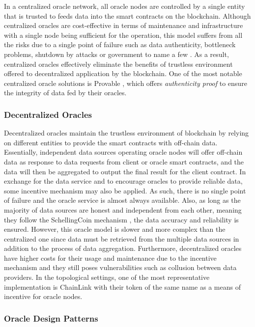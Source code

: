 In a centralized oracle network, all oracle nodes are controlled by a single entity that is trusted to feeds data into the smart contracts on the blockchain. Although centralized oracles are cost-effective in terms of maintenance and infrastructure with a single node being sufficient for the operation, this model suffers from all the risks due to a single point of failure such as data authenticity, bottleneck problems, shutdown by attacks or government to name a few \cite{caldarelli2020understanding}. As a result, centralized oracles effectively eliminate the benefits of trustless environment offered to decentralized application by the blockchain. One of the most notable centralized oracle solutions is Provable \cite{team2019scalable}, which offers \textit{authenticity proof} to ensure the integrity of data fed by their oracles.
  
\subsubsection{Decentralized Oracles}

Decentralized oracles maintain the trustless environment of blockchain by relying on different entities to provide the smart contracts with off-chain data. Essentially, independent data sources operating oracle nodes will offer off-chain data as response to data requests from client or oracle smart contracts, and the data will then be aggregated to output the final result for the client contract. In exchange for the data service and to encourage oracles to provide reliable data, some incentive mechanism may also be applied. As such, there is no single point of failure and the oracle service is almost always available. Also, as long as the majority of data sources are honest and independent from each other, meaning they follow the SchellingCoin mechanism \cite{schelling1958strategy}, the data accuracy and reliability is ensured. However, this oracle model is slower and more complex than the centralized one since data must be retrieved from the multiple data sources in addition to the process of data aggregation. Furthermore, decentralized oracles have higher costs for their usage and maintenance due to the incentive mechanism and they still poses vulnerabilities such as collusion between data providers. In the topological settings, one of the most representative implementation is ChainLink \cite{breidenbach2021chainlink} with their token of the same name as a means of incentive for oracle nodes. 

\subsubsection{Oracle Design Patterns} \label{subsubsec:background_oracle}

